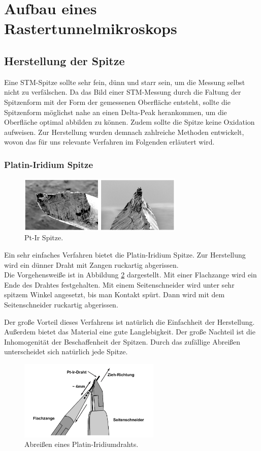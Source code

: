 \section{Aufbau eines Rastertunnelmikroskops}
\subsection{Herstellung der Spitze}

Eine STM-Spitze sollte sehr fein, dünn und starr sein, um die Messung selbst nicht zu verfälschen. Da das Bild einer STM-Messung durch die Faltung der Spitzenform mit der Form der gemessenen Oberfläche entsteht, sollte die Spitzenform möglichst nahe an einen Delta-Peak herankommen, um die Oberfläche optimal abbilden zu können. Zudem sollte die Spitze keine Oxidation aufweisen. Zur Herstellung wurden demnach zahlreiche Methoden entwickelt, wovon das für uns relevante Verfahren im Folgenden erläutert wird.


\subsubsection{Platin-Iridium Spitze}

\begin{figure}[h]
	\centering
	\includegraphics[width=0.7\textwidth]{Abb/pt-ir.png}
	\caption{Pt-Ir Spitze. \cite{nanosurf}}
	\label{ptir}
\end{figure}
Ein sehr einfaches Verfahren bietet die Platin-Iridium Spitze. Zur Herstellung wird
ein dünner Draht mit Zangen ruckartig abgerissen.\\
Die Vorgehensweiße ist in Abbildung \ref{ptirverf} dargestellt. Mit einer Flachzange
wird ein Ende des Drahtes festgehalten. Mit einem Seitenschneider wird unter sehr 
spitzem Winkel angesetzt, bis man Kontakt spürt. Dann wird mit dem Seitenschneider
ruckartig abgerissen.

Der große Vorteil dieses Verfahrens ist natürlich die Einfachheit der Herstellung.
Außerdem bietet das Material eine gute Langlebigkeit. Der große Nachteil ist die
Inhomogenität der Beschaffenheit der Spitzen. Durch das zufällige Abreißen 
unterscheidet sich natürlich jede Spitze.
\begin{figure}[H]
	\centering
	\includegraphics[width=0.6\textwidth]{Abb/pt-it-verf.png}
	\caption{Abreißen eines Platin-Iridiumdrahts. \cite{nanosurf}}
	\label{ptirverf}
\end{figure}

